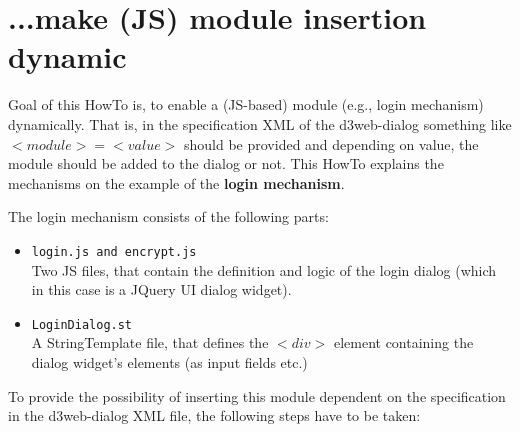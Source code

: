\documentclass[a4paper,10pt]{scrreprt}
\begin{document}
\section{...make (JS) module insertion dynamic}
Goal of this HowTo is, to enable a (JS-based) module (e.g., login mechanism) dynamically. 
That is, in the specification XML of the d3web-dialog something like $<module>=<value>$ should be provided and depending on value, the module should be added to the dialog or not.
This HowTo explains the mechanisms on the example of the \textbf{login mechanism}.\\\par
The login mechanism consists of the following parts: 
\begin{itemize}
	\item \texttt{login.js and encrypt.js}\\
	Two JS files, that contain the definition and logic of the login dialog (which in this case is a JQuery UI dialog widget).
	\item \texttt{LoginDialog.st}\\
	A StringTemplate file, that defines the $<div>$ element containing the dialog widget's elements (as input fields etc.)
\end{itemize}
To provide the possibility of inserting this module dependent on the specification in the d3web-dialog XML file, the following steps have to be taken:
\end{document}
